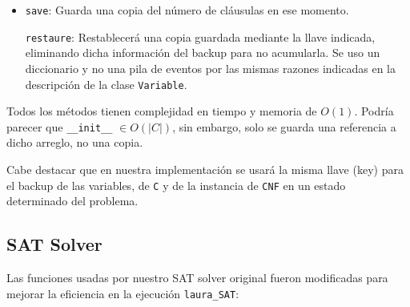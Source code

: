 \documentclass[letterpaper,12pt]{article}
\begin{document}
\begin{itemize}
\begin{itemize}
	    \item \texttt{save}: Guarda una copia del n\'umero de cl\'ausulas en ese momento.
	    
	    \texttt{restaure}: Restablecerá una copia guardada mediante la llave indicada, eliminando dicha informaci\'on del backup para no acumularla. Se uso un diccionario y no una pila de eventos por las mismas razones indicadas en la descripci\'on de la clase \texttt{Variable}.
	\end{itemize}
	
	Todos los m\'etodos tienen complejidad en tiempo y memoria de $O(1)$. Podr\'ia parecer que \texttt{\_\_init\_\_} $\in O(|C|)$, sin embargo, solo se guarda una referencia a dicho arreglo, no una copia.
\end{itemize}

Cabe destacar que en nuestra implementaci\'on se usar\'a la misma llave (key) para el backup de las variables, de \texttt{C} y de la instancia de \texttt{CNF} en un estado determinado del problema.



\subsection{SAT Solver}

Las funciones usadas por nuestro SAT solver original fueron modificadas para mejorar la eficiencia en la ejecución \texttt{laura\_SAT}:\\
\end{document}
